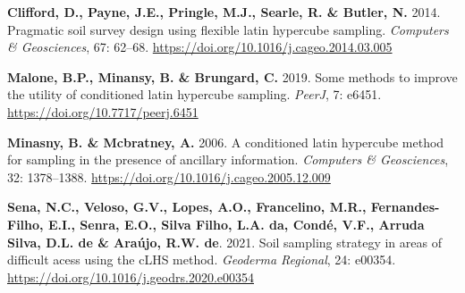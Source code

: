 \documentclass[
]{book}
\newlength{\cslhangindent}
\newlength{\cslentryspacingunit} %
\newenvironment{CSLReferences}[2] %
 {%
  \setlength{\parindent}{0pt}
  \ifodd #1
  \let\oldpar\par
  \def\par{\hangindent=\cslhangindent\oldpar}
  \fi
  \setlength{\parskip}{#2\cslentryspacingunit}
 }%
 {}
\begin{document}
\hypertarget{refs}{}
\begin{CSLReferences}{0}{0}
\leavevmode{}%
\textbf{Clifford, D., Payne, J.E., Pringle, M.J., Searle, R. \& Butler, N.} 2014. Pragmatic soil survey design using flexible latin hypercube sampling. \emph{Computers \& Geosciences}, 67: 62--68. \url{https://doi.org/10.1016/j.cageo.2014.03.005}

\leavevmode{}%
\textbf{Malone, B.P., Minansy, B. \& Brungard, C.} 2019. Some methods to improve the utility of conditioned latin hypercube sampling. \emph{PeerJ}, 7: e6451. \url{https://doi.org/10.7717/peerj.6451}

\leavevmode{}%
\textbf{Minasny, B. \& Mcbratney, A.} 2006. A conditioned latin hypercube method for sampling in the presence of ancillary information. \emph{Computers \& Geosciences}, 32: 1378--1388. \url{https://doi.org/10.1016/j.cageo.2005.12.009}

\leavevmode{}%
\textbf{Sena, N.C., Veloso, G.V., Lopes, A.O., Francelino, M.R., Fernandes-Filho, E.I., Senra, E.O., Silva Filho, L.A. da, Condé, V.F., Arruda Silva, D.L. de \& Araújo, R.W. de}. 2021. Soil sampling strategy in areas of difficult acess using the cLHS method. \emph{Geoderma Regional}, 24: e00354. \url{https://doi.org/10.1016/j.geodrs.2020.e00354}

\end{CSLReferences}
\end{document}
